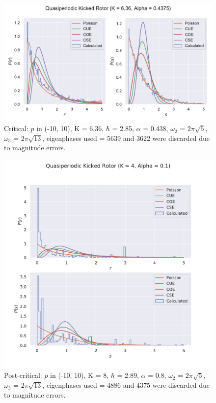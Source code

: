 \documentclass[12pt]{article}
\begin{document}
\begin{figure}[h]
    \includegraphics[width=\linewidth]{quasiperiodic_kickedrotor_spectrum_N10_critical}
    \caption{Critical: $p$ in (-10, 10), K = 6.36, $\hbar$ = 2.85, $\alpha$ = 0.438,
    $\omega_2$ = $2\pi\sqrt{5}$, $\omega_3$ = $2\pi\sqrt{13}$, eigenphases
    used = 5639 and 3622 were discarded due to magnitude errors.}
    \centering
\end{figure}

\begin{figure}[h]
    \includegraphics[width=\linewidth]{quasiperiodic_kickedrotor_spectrum_N10_precritical}
    \caption{Post-critical: $p$ in (-10, 10), K = 8, $\hbar$ = 2.89, $\alpha$ = 0.8,
    $\omega_2$ = $2\pi\sqrt{5}$, $\omega_3$ = $2\pi\sqrt{13}$, eigenphases
    used = 4886 and 4375 were discarded due to magnitude errors.}
    \centering
\end{figure}

\nocite{*}
\printbibliography
\end{document}
